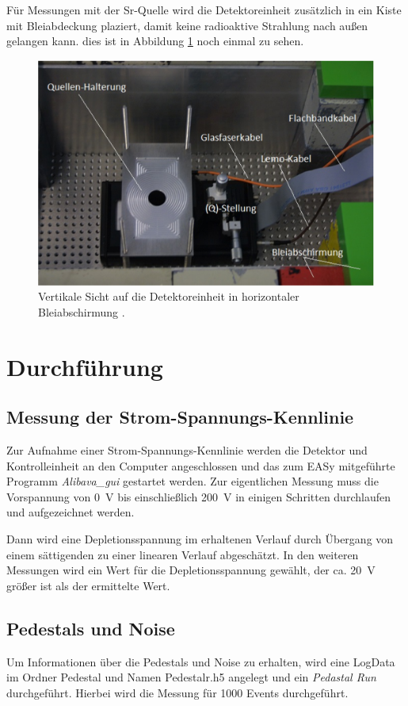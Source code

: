 \FloatBarrier
Für Messungen mit der Sr-Quelle wird die Detektoreinheit zusätzlich in ein Kiste
mit Bleiabdeckung plaziert, damit keine radioaktive Strahlung nach außen gelangen
kann. dies ist in Abbildung \ref{fig:quell} noch einmal zu sehen.
\begin{figure}[htb]
  \centering
  \includegraphics{images/Abschirmung.png}
  \caption{Vertikale Sicht auf die Detektoreinheit in horizontaler Bleiabschirmung \cite{anleitung}.}
  \label{fig:quell}
\end{figure}
\FloatBarrier
\section{Durchführung}
\label{sec:Durchführung}

\subsection{Messung der Strom-Spannungs-Kennlinie}
\label{sec:Kennlinie}
Zur Aufnahme einer Strom-Spannungs-Kennlinie werden die Detektor und Kontrolleinheit
an den Computer angeschlossen und das zum EASy mitgeführte Programm \textit{Alibava\_gui}
gestartet werden. Zur eigentlichen Messung muss die Vorspannung von \SI{0}{\volt} bis
einschließlich \SI{200}{\volt} in einigen Schritten durchlaufen und aufgezeichnet werden.

Dann wird eine Depletionsspannung im erhaltenen Verlauf durch Übergang von einem
sättigenden zu einer linearen Verlauf abgeschätzt. In den weiteren Messungen wird
ein Wert für die Depletionsspannung gewählt, der ca. \SI{20}{\volt} größer ist als
der ermittelte Wert.

\subsection{Pedestals und Noise}
\label{sec:Auswertung_Noise}
Um Informationen über die Pedestals und Noise zu erhalten, wird eine LogData im
Ordner Pedestal und Namen Pedestalr.h5 angelegt und ein \textit{Pedastal Run}
durchgeführt. Hierbei wird die Messung für 1000 Events durchgeführt.

